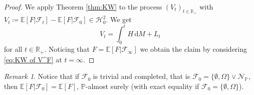 \documentclass[11pt,a4paper,twoside,openany]{report}
\numberwithin{equation}{section}
\newcommand{\diff}{\mathrm{d}}
\theoremstyle{plain} %
\theoremstyle{definition} %
\theoremstyle{remark} %
\newtheorem{remark}[theorem]{Remark}
\begin{document}
\begin{proof}
    We apply Theorem \ref{thm:KW} to the process \((V_t)_{t\in\mathbb{R}_+}\) with \(V_t\coloneqq \mathbb{E}[F|\mathcal{F}_t]-\mathbb{E}[F|\mathcal{F}_0]\in\mathcal{H}_0^2\). We get 
    \begin{equation}\label{eq:KW of V^F}
        V_t=\int_0^t H\,\diff M+L_t
    \end{equation}
    for all \(t\in\mathbb{R}_+\).
    Noticing that \(F=\mathbb{E}[F|\mathcal{F}_{\infty}]\) we obtain the claim by considering \eqref{eq:KW of V^F} at \(t=\infty\). 
\end{proof}
\begin{remark}
Notice that if \(\mathcal{F}_0\) is trivial and completed, that is \(\mathcal{F}_0=\{\emptyset,\Omega\}\vee\mathcal{N}_{\mathbb{P}}\), then \(\mathbb{E}[F|\mathcal{F}_0]=\mathbb{E}[F]\), \(\mathbb{P}\)-almost surely (with exact equality if \(\mathcal{F}_0=\{\emptyset,\Omega\}\)). 
\end{remark}
\end{document}
